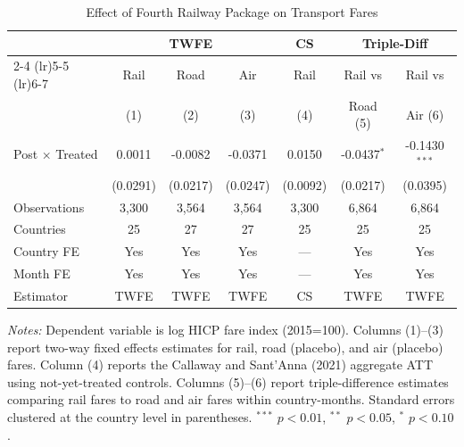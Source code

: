 \begin{table}[htbp]
\centering
\caption{Effect of Fourth Railway Package on Transport Fares}
\label{tab:main}
\begin{tabular}{lcccccc}
\hline\hline
 & \multicolumn{3}{c}{TWFE} & CS & \multicolumn{2}{c}{Triple-Diff} \\
\cmidrule(lr){2-4} \cmidrule(lr){5-5} \cmidrule(lr){6-7}
 & Rail & Road & Air & Rail & Rail vs & Rail vs \\
 & (1) & (2) & (3) & (4) & Road (5) & Air (6) \\
\hline
Post $\times$ Treated & 0.0011 & -0.0082 & -0.0371 & 0.0150 & -0.0437$^{*}$ & -0.1430$^{***}$ \\
  & (0.0291) & (0.0217) & (0.0247) & (0.0092) & (0.0217) & (0.0395) \\
\hline
Observations & 3,300 & 3,564 & 3,564 & 3,300 & 6,864 & 6,864 \\
Countries & 25 & 27 & 27 & 25 & 25 & 25 \\
Country FE & Yes & Yes & Yes & --- & Yes & Yes \\
Month FE & Yes & Yes & Yes & --- & Yes & Yes \\
Estimator & TWFE & TWFE & TWFE & CS & TWFE & TWFE \\
\hline\hline
\end{tabular}
\begin{tablenotes}[flushleft]\footnotesize
\item \textit{Notes:} Dependent variable is log HICP fare index (2015=100). Columns (1)--(3) report two-way fixed effects estimates for rail, road (placebo), and air (placebo) fares. Column (4) reports the Callaway and Sant'Anna (2021) aggregate ATT using not-yet-treated controls. Columns (5)--(6) report triple-difference estimates comparing rail fares to road and air fares within country-months. Standard errors clustered at the country level in parentheses. $^{***}$ $p<0.01$, $^{**}$ $p<0.05$, $^{*}$ $p<0.10$.
\end{tablenotes}
\end{table}
